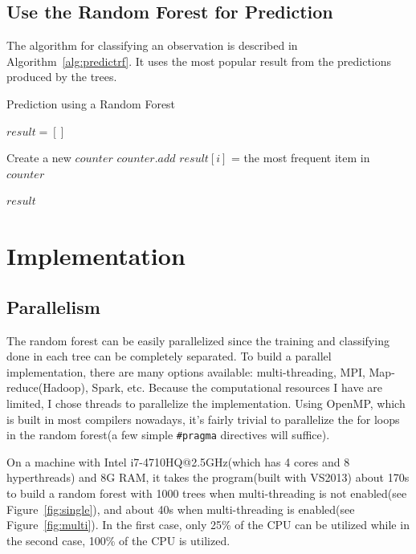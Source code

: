 \documentclass{article}
\begin{document}
\subsection{Use the Random Forest for Prediction}

The algorithm for classifying an observation is described in Algorithm~\ref{alg:predictrf}. It uses the most popular result from the predictions produced by the trees.

\begin{algorithm}[H]
	\centering
	\caption{Prediction using a Random Forest}
	\label{alg:predictrf}
	\begin{algorithmic}[1]
			\State $result = []$ 

				\State Create a new $counter$
					\State $counter.add$
				\EndFor
				\State $result[i]$ = the most frequent item in $counter$
			\EndFor

			\State \Return $result$
		\EndFunction
	\end{algorithmic}
\end{algorithm}

\section{Implementation}

\subsection{Parallelism}

The random forest can be easily parallelized since the training and classifying done in each tree can be completely separated. To build a parallel implementation, there are many options available: multi-threading, MPI, Map-reduce(Hadoop), Spark, etc. Because the computational resources I have are limited, I chose threads to parallelize the implementation. Using OpenMP, which is built in most compilers nowadays, it's fairly trivial to parallelize the for loops in the random forest(a few simple \texttt{\#pragma} directives will suffice).

On a machine with Intel i7-4710HQ@2.5GHz(which has 4 cores and 8 hyperthreads) and 8G RAM, it takes the program(built with VS2013) about 170s to build a random forest with 1000 trees when multi-threading is not enabled(see Figure~\ref{fig:single}), and  about 40s when multi-threading is enabled(see Figure~\ref{fig:multi}). In the first case, only 25\% of the CPU can be utilized while in the second case, 100\% of the CPU is utilized.
\end{document}
